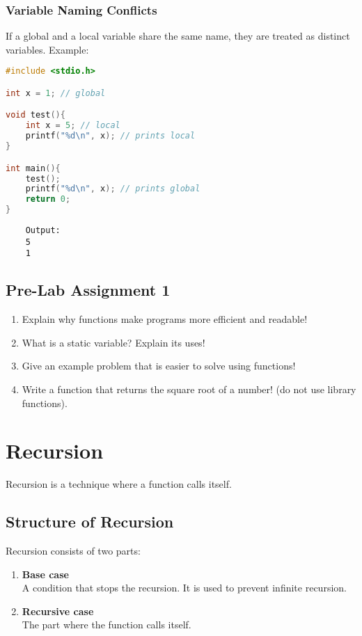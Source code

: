 \subsubsection{Variable Naming Conflicts}

If a global and a local variable share the same name, they are treated as distinct variables.
Example:
\begin{lstlisting}[language=c]
#include <stdio.h>

int x = 1; // global

void test(){
	int x = 5; // local
	printf("%d\n", x); // prints local
}

int main(){
	test();
	printf("%d\n", x); // prints global
	return 0;
}
\end{lstlisting}
\begin{verbatim}
	Output:
	5
	1
\end{verbatim}

\subsection*{Pre-Lab Assignment 1}
\begin{enumerate}
    \item Explain why functions make programs more efficient and readable!
    \item What is a static variable? Explain its uses!
    \item Give an example problem that is easier to solve using functions!
    \item Write a function that returns the square root of a number! (do not use library functions).
\end{enumerate}

\section{Recursion}

Recursion is a technique where a function calls itself.

\subsection{Structure of Recursion}

Recursion consists of two parts:
\begin{enumerate}
    \item \textbf{Base case} \\
    A condition that stops the recursion.
    It is used to prevent infinite recursion.
    \item \textbf{Recursive case} \\
    The part where the function calls itself.
\end{enumerate}

